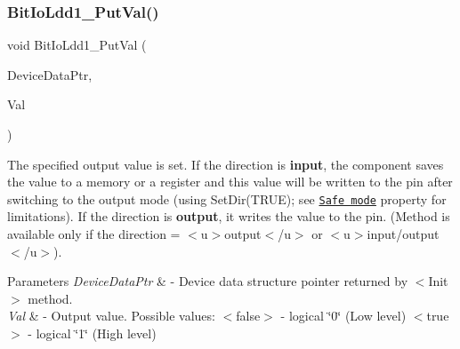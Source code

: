 \subsubsection{\texorpdfstring{Bit\+Io\+Ldd1\+\_\+\+Put\+Val()}{BitIoLdd1\_PutVal()}}
{\footnotesize\ttfamily void Bit\+Io\+Ldd1\+\_\+\+Put\+Val (\begin{DoxyParamCaption}\item[{\hyperlink{group___p_e___types__module_gac5cf1362f1f0e3a2ce71b1bf2276d091}{L\+D\+D\+\_\+\+T\+Device\+Data} $\ast$}]{Device\+Data\+Ptr,  }\item[{bool}]{Val }\end{DoxyParamCaption})}



The specified output value is set. If the direction is {\bfseries  input}, the component saves the value to a memory or a register and this value will be written to the pin after switching to the output mode (using {\ttfamily Set\+Dir(\+T\+R\+U\+E)}; see \href{BitIOProperties.html#SafeMode}{\tt Safe mode} property for limitations). If the direction is {\bfseries output}, it writes the value to the pin. (Method is available only if the direction = $<$u$>${\ttfamily output}$<$/u$>$ or $<$u$>${\ttfamily  input/output}$<$/u$>$). 


\begin{DoxyParams}{Parameters}
{\em Device\+Data\+Ptr} & -\/ Device data structure pointer returned by $<$\+Init$>$ method. \\
\hline
{\em Val} & -\/ Output value. Possible values\+: $<$false$>$ -\/ logical \char`\"{}0\char`\"{} (Low level) $<$true$>$ -\/ logical \char`\"{}1\char`\"{} (High level) \\
\hline
\end{DoxyParams}

